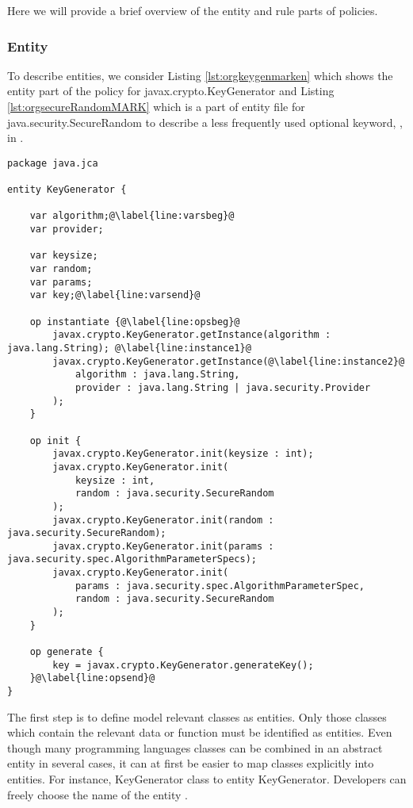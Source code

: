 Here we will provide a brief overview of the entity and rule parts of \MARK{} policies.

\subsubsection{Entity}
\label{subsubsec:entity}
To describe entities, we consider Listing \ref{lst:orgkeygenmarken} which shows the entity part of the \MARK{} policy for javax.crypto.KeyGenerator and Listing \ref{lst:orgsecureRandomMARK} which is a part of \MARK{} entity file for java.security.SecureRandom to describe a less frequently used optional keyword, , in \MARK{}.

\begin{lstlisting}[language=MARK,caption= {\MARK{} entities for javax.crypto.KeyGenerator of Bouncy Castle ruleset \cite{codyzegit}}, label={lst:orgkeygenmarken}, escapechar=@]
package java.jca

entity KeyGenerator {
    
    var algorithm;@\label{line:varsbeg}@
    var provider;
    
    var keysize;
    var random;
    var params;
    var key;@\label{line:varsend}@
    
    op instantiate {@\label{line:opsbeg}@
        javax.crypto.KeyGenerator.getInstance(algorithm : java.lang.String); @\label{line:instance1}@
        javax.crypto.KeyGenerator.getInstance(@\label{line:instance2}@
            algorithm : java.lang.String,
            provider : java.lang.String | java.security.Provider
        );
    }
    
    op init {
        javax.crypto.KeyGenerator.init(keysize : int);
        javax.crypto.KeyGenerator.init(
            keysize : int,
            random : java.security.SecureRandom
        );
        javax.crypto.KeyGenerator.init(random : java.security.SecureRandom);
        javax.crypto.KeyGenerator.init(params : java.security.spec.AlgorithmParameterSpecs);
        javax.crypto.KeyGenerator.init(
            params : java.security.spec.AlgorithmParameterSpec,
            random : java.security.SecureRandom
        );
    }
    
    op generate {
        key = javax.crypto.KeyGenerator.generateKey();
    }@\label{line:opsend}@
}
\end{lstlisting}

The first step is to define model relevant classes as \MARK{} entities. Only those classes which contain the relevant data or function must be identified as \MARK{} entities. Even though many programming languages classes can be combined in an abstract \MARK{} entity in several cases, it can at first be easier to map classes explicitly into entities. For instance, KeyGenerator class to entity KeyGenerator. Developers can freely choose the name of the entity \cite{cod}.

